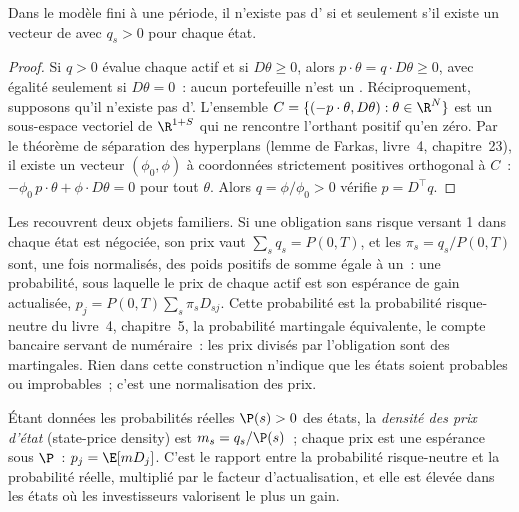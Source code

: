 \begin{theorem}\label{thm:dv:no-arbitrage-and-the-fundamental-theorems:ftap1}
Dans le modèle fini à une période, il n'existe pas d' si et seulement s'il existe un
vecteur de  avec $q_s>0$ pour chaque état.
\end{theorem}
\begin{proof}
Si $q>0$ évalue chaque actif et si $D\theta\ge0$, alors $p\cdot\theta=q\cdot
D\theta\ge0$, avec égalité seulement si $D\theta=0$~: aucun portefeuille n'est
un . Réciproquement, supposons qu'il n'existe pas d'. L'ensemble
$C=\{(-p\cdot\theta, D\theta):\theta\in\R^N\}$ est un sous-espace vectoriel de
$\R^{1+S}$ qui ne rencontre l'orthant positif qu'en zéro. Par le théorème de
séparation des hyperplans (lemme de Farkas, livre~4, chapitre~23), il existe un
vecteur $(\phi_0,\phi)$ à coordonnées strictement positives orthogonal à $C$~:
$-\phi_0\,p\cdot\theta+\phi\cdot D\theta=0$ pour tout $\theta$. Alors
$q=\phi/\phi_0>0$ vérifie $p=D^\top q$.
\end{proof}

Les  recouvrent deux objets familiers. Si une obligation sans risque versant 1 dans
chaque état est négociée, son prix vaut $\sum_sq_s=P(0,T)$, et les
$\pi_s=q_s/P(0,T)$ sont, une fois normalisés, des poids positifs de somme égale à un~: une probabilité, sous laquelle
le prix de chaque actif est son espérance de gain actualisée,
$p_j=P(0,T)\sum_s\pi_sD_{sj}$. Cette probabilité est la probabilité risque-neutre du
livre~4, chapitre~5, la probabilité martingale équivalente, le compte bancaire servant de
numéraire~: les prix divisés par l'obligation sont des martingales. Rien dans cette
construction n'indique que les états soient probables ou improbables~; c'est une normalisation des prix.

\begin{definition}\label{def:dv:no-arbitrage-and-the-fundamental-theorems:spd}
Étant données les probabilités réelles $\P(s)>0$ des états, la
\emph{densité des prix d'état} (state-price density) est $m_s=q_s/\P(s)$~; chaque
prix est une espérance sous $\P$~: $p_j=\E[mD_j]$. C'est le rapport entre la
probabilité risque-neutre et la probabilité réelle, multiplié par le facteur d'actualisation, et elle est
élevée dans les états où les investisseurs valorisent le plus un gain.
\end{definition}


